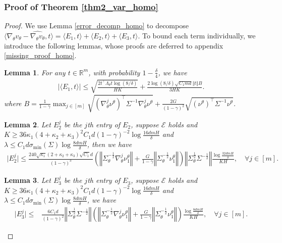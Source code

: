 \documentclass{article}
\newtheorem{lemma}{Lemma}[section]
\numberwithin{equation}{section}
\begin{document}
\subsubsection{Proof of Theorem \ref{thm2_var_homo}}
\label{pfthm2_var_homo}
\begin{proof}
We use Lemma \ref{error_decomp_homo} to decompose $\langle\nabla_\theta v_\theta - \widehat{\nabla_\theta v_\theta}, t\rangle=\langle E_1, t\rangle+\langle E_2,t\rangle+\langle E_3,t\rangle$. To bound each term individually, we introduce the following lemmas, whose proofs are deferred to appendix \ref{missing_proof_homo}. 
\begin{lemma}
\label{e1_finite_product_homo}
For any $t\in\mathbb{R}^m$, with probability $1-\frac{\delta}{4}$, we have
\begin{align*}
    \vert\langle E_1, t\rangle\vert\leq\sqrt{\frac{2t^\top\Lambda_\theta t\log(8/\delta)}{HK}}+\frac{2\log(8/\delta)\sqrt{C_1md}\Vert t\Vert B}{3HK}. 
\end{align*}
where $B=\frac{1}{1-\gamma}\max_{j\in[m]}\sqrt{\left(\nabla^j_\theta\nu^\theta\right)^\top\Sigma^{-1}\nabla^j_\theta\nu^\theta}+\frac{2G}{(1-\gamma)^2}\sqrt{\left(\nu^\theta\right)^\top\Sigma^{-1}\nu^\theta}$.
\end{lemma}
\begin{lemma}
\label{e2_homo}
Let $E_2^j$ be the $j$th entry of $E_2$, suppose $\mathcal{E}$ holds and $K\geq 36\kappa_1(4+\kappa_2+\kappa_3)^2C_1d(1-\gamma)^{-2}\log\frac{16dmH}{\delta}$ and $\lambda\leq C_1d\sigma_{\min}(\Sigma)\log\frac{8dmH}{\delta}$, then we have 
\begin{align*}
    \vert E_2^j\vert\leq \frac{240\sqrt{\kappa_1}(2+\kappa_2+\kappa_3)\sqrt{C_1}d}{(1-\gamma)^3}\left(\left\Vert\Sigma_\theta^{-\frac{1}{2}}\nabla_\theta^j\nu^\theta_1\right\Vert+\frac{G}{1-\gamma}\left\Vert\Sigma_\theta^{-\frac{1}{2}}\nu^\theta_1\right\Vert\right)\left\Vert\Sigma_\theta^{\frac{1}{2}}\Sigma^{-\frac{1}{2}}\right\Vert\frac{\log\frac{32dmH}{\delta}}{KH},\quad\forall j\in[m].
\end{align*}
\end{lemma}
\begin{lemma}
\label{e3_homo}
Let $E_3^j$ be the $j$th entry of $E_3$, suppose $\mathcal{E}$ holds and $K\geq 36\kappa_1(4+\kappa_2+\kappa_3)^2C_1d(1-\gamma)^{-2}\log\frac{16dmH}{\delta}$ and $\lambda\leq C_1d\sigma_{\min}(\Sigma)\log\frac{8dmH}{\delta}$, we have 
\begin{align*}
    \vert E_3^j\vert\leq&\frac{6C_1d}{(1-\gamma)^2}\left\Vert\Sigma_\theta^{\frac{1}{2}}\Sigma^{-\frac{1}{2}}\right\Vert\left(\left\Vert\Sigma_\theta^{-\frac{1}{2}}\nabla_\theta^j\nu^\theta_1\right\Vert+\frac{G}{1-\gamma}\left\Vert\Sigma_\theta^{-\frac{1}{2}}\nu^\theta_1\right\Vert\right)\frac{\log\frac{8dmH}{\delta}}{KH},\quad\forall j\in[m]. 

\end{align*}
\end{lemma}
\end{proof}
\end{document}

